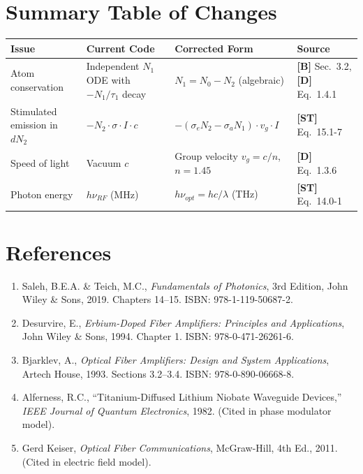 \documentclass[12pt,a4paper]{article}
\begin{document}
\section{Summary Table of Changes}

\begin{center}
\renewcommand{\arraystretch}{1.6}
\begin{tabular}{p{3cm} p{5cm} p{4cm} p{2cm}}
\toprule
\textbf{Issue} & \textbf{Current Code} & \textbf{Corrected Form} & \textbf{Source} \\
\midrule
Atom conservation & Independent $N_1$ ODE with $-N_1/\tau_1$ decay & $N_1 = N_0 - N_2$ (algebraic) & \textbf{[B]} Sec.~3.2, \textbf{[D]} Eq.~1.4.1 \\
Stimulated emission in $dN_2$ & $-N_2 \cdot \sigma \cdot I \cdot c$ & $-(\sigma_e N_2 - \sigma_a N_1) \cdot v_g \cdot I$ & \textbf{[ST]} Eq.~15.1-7 \\
Speed of light & Vacuum $c$ & Group velocity $v_g = c/n$, $n = 1.45$ & \textbf{[D]} Eq.~1.3.6 \\
Photon energy & $h \nu_{RF}$ (MHz) & $h \nu_{opt} = hc/\lambda$ (THz) & \textbf{[ST]} Eq.~14.0-1 \\
\bottomrule
\end{tabular}
\end{center}

\section{References}

\begin{enumerate}
    \item[\textbf{[ST]}] Saleh, B.E.A. \& Teich, M.C., \textit{Fundamentals of Photonics}, 3rd Edition, John Wiley \& Sons, 2019. Chapters 14--15. ISBN: 978-1-119-50687-2.
    \item[\textbf{[D]}] Desurvire, E., \textit{Erbium-Doped Fiber Amplifiers: Principles and Applications}, John Wiley \& Sons, 1994. Chapter 1. ISBN: 978-0-471-26261-6.
    \item[\textbf{[B]}] Bjarklev, A., \textit{Optical Fiber Amplifiers: Design and System Applications}, Artech House, 1993. Sections 3.2--3.4. ISBN: 978-0-890-06668-8.
    \item Alferness, R.C., ``Titanium-Diffused Lithium Niobate Waveguide Devices,'' \textit{IEEE Journal of Quantum Electronics}, 1982. (Cited in phase modulator model).
    \item Gerd Keiser, \textit{Optical Fiber Communications}, McGraw-Hill, 4th Ed., 2011. (Cited in electric field model).
\end{enumerate}
\end{document}
